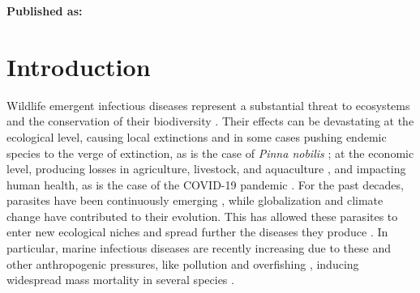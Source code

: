 





\textbf{Published as:}

\vspace{0.5cm}


\newpage
\section{Introduction}

Wildlife emergent infectious diseases represent a substantial threat to
ecosystems and the conservation of their biodiversity \cite{Daszak2000}. Their
effects can be devastating at the ecological level, causing local extinctions
\cite{Daszak2000} and in some cases pushing endemic species to the verge of
extinction, as is the case of \textit{Pinna nobilis} \cite{Cabanellas2019}; at
the economic level, producing losses in agriculture, livestock, and aquaculture
\cite{Vurro2010, Tomley2009, Pernet2016}, and impacting human health, as is the
case of the COVID-19 pandemic \cite{Salata2020}. For the past decades,
parasites have been continuously emerging \cite{Morens2004, Daszak2017}, while
globalization and climate change have contributed to their evolution. This has
allowed these parasites to enter new ecological niches and spread further the
diseases they produce \cite{Aguirre2008}. In particular, marine infectious
diseases are recently increasing due to these and other anthropogenic
pressures, like pollution and overfishing \cite{Lafferty2004}, inducing
widespread mass mortality in several species \cite{Eisenlord2016, JONES201648,
    VAZQUEZ2017}.

